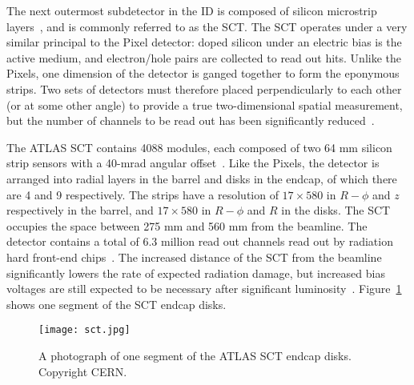 The next outermost subdetector in the ID is composed of silicon microstrip layers~\cite{SCTPaper,ATLASPaper}, and is commonly referred to as the SCT.  The SCT operates under a very similar principal to the Pixel detector: doped silicon under an electric bias is the active medium, and electron/hole pairs are collected to read out hits. Unlike the Pixels, one dimension of the detector is ganged together to form the eponymous strips. Two sets of detectors must therefore placed perpendicularly to each other (or at some other angle) to provide a true two-dimensional spatial measurement, but the number of channels to be read out has been significantly reduced~\cite{Detectors}.

The ATLAS SCT contains 4088 modules, each composed of two 64 mm silicon strip sensors with a 40-mrad angular offset~\cite{ATLASPaper}. Like the Pixels, the detector is arranged into radial layers in the barrel and disks in the endcap, of which there are 4 and 9 respectively. The strips have a resolution of $17 \times 580$ in $R-\phi$ and $z$ respectively in the barrel, and $17 \times 580$ in $R-\phi$ and $R$ in the disks. The SCT occupies the space between 275 mm and 560 mm from the beamline. The detector contains a total of 6.3 million read out channels read out by radiation hard front-end chips~\cite{SCTReadout}. The increased distance of the SCT from the beamline significantly lowers the rate of expected radiation damage, but increased bias voltages are still expected to be necessary after significant luminosity~\cite{SCTPaper,ATLASPaper}.  Figure~\ref{fig:detector:sct} shows one segment of the SCT endcap disks.



\begin{figure}
\centering
\texttt{[image: sct.jpg]}
\label{fig:detector:sct}
\caption{A photograph of one segment of the ATLAS SCT endcap disks. Copyright CERN.}
\end{figure}


